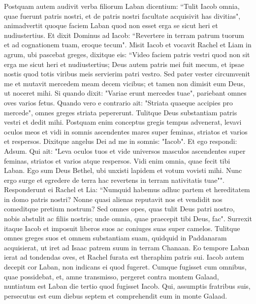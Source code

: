 \begin{biblechapter}  
\verse Postquam autem audivit verba filiorum Laban dicentium: “Tulit Iacob omnia, quae fuerunt patris nostri, et de patris nostri facultate acquisivit has divitias", 
\verse animadvertit quoque faciem Laban quod non esset erga se sicut heri et nudiustertius. 
\verse Et dixit Dominus ad Iacob: “Revertere in terram patrum tuorum et ad cognationem tuam, eroque tecum". 
\verse Misit Iacob et vocavit Rachel et Liam in agrum, ubi pascebat greges, 
\verse dixitque eis: “Video faciem patris vestri quod non sit erga me sicut heri et nudiustertius; Deus autem patris mei fuit mecum, 
\verse et ipsae nostis quod totis viribus meis servierim patri vestro. 
\verse Sed pater vester circumvenit me et mutavit mercedem meam decem vicibus; et tamen non dimisit eum Deus, ut noceret mihi. 
\verse Si quando dixit: "Variae erunt mercedes tuae", pariebant omnes oves varios fetus. Quando vero e contrario ait: "Striata quaeque accipies pro mercede", omnes greges striata pepererunt. 
\verse Tulitque Deus substantiam patris vestri et dedit mihi. 
\verse Postquam enim conceptus gregis tempus advenerat, levavi oculos meos et vidi in somnis ascendentes mares super feminas, striatos et varios et respersos. 
\verse Dixitque angelus Dei ad me in somnis: "Iacob". Et ego respondi: Adsum. 
\verse Qui ait: "Leva oculos tuos et vide universos masculos ascendentes super feminas, striatos et varios atque respersos. Vidi enim omnia, quae fecit tibi Laban.  
\verse Ego sum Deus Bethel, ubi unxisti lapidem et votum vovisti mihi. Nunc ergo surge et egredere de terra hac revertens in terram nativitatis tuae"". 
\verse Responderunt ei Rachel et Lia: “Numquid habemus adhuc partem et hereditatem in domo patris nostri? 
\verse Nonne quasi alienas reputavit nos et vendidit nos comeditque pretium nostrum? 
\verse Sed omnes opes, quas tulit Deus patri nostro, nobis abstulit ac filiis nostris; unde omnia, quae praecepit tibi Deus, fac". 
\verse Surrexit itaque Iacob et imposuit liberos suos ac coniuges suas super camelos. 
\verse Tulitque omnes greges suos et omnem substantiam suam, quidquid in Paddanaram acquisierat, ut iret ad Isaac patrem suum in terram Chanaan. 
\verse Eo tempore Laban ierat ad tondendas oves, et Rachel furata est theraphim patris sui. 
\verse Iacob autem decepit cor Laban, non indicans ei quod fugeret. 
\verse Cumque fugisset cum omnibus, quae possidebat, et, amne transmisso, pergeret contra montem Galaad, 
\verse nuntiatum est Laban die tertio quod fugisset Iacob.  
\verse Qui, assumptis fratribus suis, persecutus est eum diebus septem et comprehendit eum in monte Galaad. 

\end{biblechapter}
